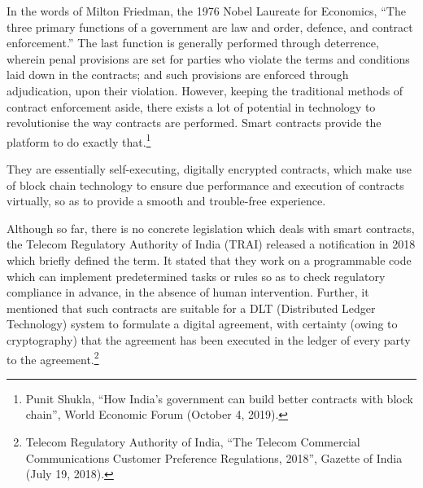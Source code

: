 \setcounter{figure}{0}
\setcounter{table}{0}
\setcounter{footnote}{0}




\begin{multicols}{2}


\noi
In the words of Milton Friedman, the 1976 Nobel Laureate for Economics, “The three
primary functions of a government are law and order, defence, and contract enforcement.”
The last function is generally performed through deterrence, wherein penal provisions are set
for parties who violate the terms and conditions laid down in the contracts; and such
provisions are enforced through adjudication, upon their violation. However, keeping the
traditional methods of contract enforcement aside, there exists a lot of potential in technology
to revolutionise the way contracts are performed. Smart contracts provide the platform to do
exactly that.\footnote{Punit Shukla, “How India's government can build better contracts with block chain”, World Economic Forum (October 4, 2019).}

\noi
They are essentially self-executing, digitally encrypted contracts, which make use of block
chain technology to ensure due performance and execution of contracts virtually, so as to
provide a smooth and trouble-free experience.

\noi
Although so far, there is no concrete legislation which deals with smart contracts, the
Telecom Regulatory Authority of India (TRAI) released a notification in 2018 which briefly
defined the term. It stated that they work on a programmable code which can implement predetermined tasks or rules so as to check regulatory compliance in advance, in the absence of
human intervention. Further, it mentioned that such contracts are suitable for a DLT
(Distributed Ledger Technology) system to formulate a digital agreement, with certainty
(owing to cryptography) that the agreement has been executed in the ledger of every party to
the agreement.\footnote{Telecom Regulatory Authority of India, “The Telecom Commercial Communications Customer Preference Regulations, 2018”, Gazette of India (July 19, 2018). }


\end{multicols}
